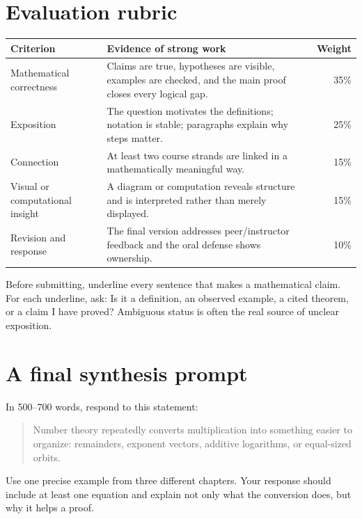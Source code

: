 \section{Evaluation rubric}

\begin{center}
\small
\begin{tabularx}{\textwidth}{>{\raggedright\arraybackslash}p{}Xr}
\toprule
Criterion & Evidence of strong work & Weight \\
\midrule
Mathematical correctness & Claims are true, hypotheses are visible, examples are checked, and the main proof closes every logical gap. & 35\% \\
Exposition & The question motivates the definitions; notation is stable; paragraphs explain why steps matter. & 25\% \\
Connection & At least two course strands are linked in a mathematically meaningful way. & 15\% \\
Visual or computational insight & A diagram or computation reveals structure and is interpreted rather than merely displayed. & 15\% \\
Revision and response & The final version addresses peer/instructor feedback and the oral defense shows ownership. & 10\% \\
\bottomrule
\end{tabularx}
\end{center}

\begin{checkpoint}
Before submitting, underline every sentence that makes a mathematical claim. For each underline, ask: Is it a definition, an observed example, a cited theorem, or a claim I have proved? Ambiguous status is often the real source of unclear exposition.
\end{checkpoint}

\section{A final synthesis prompt}

In 500--700 words, respond to this statement:

\begin{quote}
Number theory repeatedly converts multiplication into something easier to organize: remainders, exponent vectors, additive logarithms, or equal-sized orbits.
\end{quote}

Use one precise example from three different chapters. Your response should include at least one equation and explain not only what the conversion does, but why it helps a proof.
